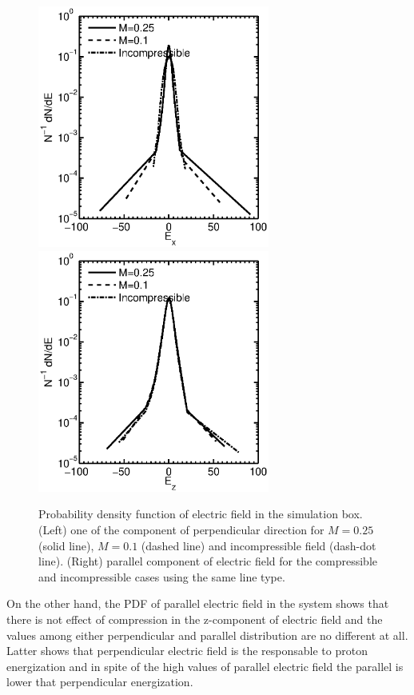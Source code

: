 \documentclass[%
aip,pop,amsmath,amssymb,
 reprint,%
]{revtex4-1}
\begin{document}
\begin{figure}
\begin{center}
{\includegraphics[width = 3in]{./Figures/Fig4_b}}
{\includegraphics[width = 3in]{./Figures/Fig4_2}}
\caption{Probability density function of electric field in the simulation box. (Left) one of the 
component of perpendicular direction for $M=0.25$ (solid line), $M=0.1$ (dashed line) and incompressible field (dash-dot line). (Right) parallel component of electric field for the compressible and incompressible cases using the same line type.}
\end{center}
\label{mean square velocity}
\end{figure}
On the other hand, the PDF of parallel electric field in the system shows that there is not
effect of compression in the z-component of electric field and the values among either perpendicular
and parallel distribution are no different at all. Latter shows that perpendicular electric field is
the responsable to proton energization and in spite of the high values of parallel electric field
the parallel is lower that perpendicular energization.
\end{document}
